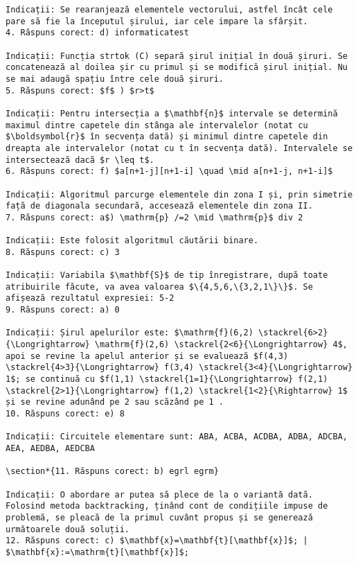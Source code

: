 \begin{verbatim}
Indicații: Se rearanjează elementele vectorului, astfel încât cele pare să fie la începutul șirului, iar cele impare la sfârșit.
4. Răspuns corect: d) informaticatest

Indicații: Funcția strtok (C) separă șirul inițial în două șiruri. Se concatenează al doilea șir cu primul și se modifică șirul inițial. Nu se mai adaugă spațiu între cele două șiruri.
5. Răspuns corect: $f$ ) $r>t$

Indicații: Pentru intersecția a $\mathbf{n}$ intervale se determină maximul dintre capetele din stânga ale intervalelor (notat cu $\boldsymbol{r}$ în secvența dată) și minimul dintre capetele din dreapta ale intervalelor (notat cu t în secvența dată). Intervalele se intersectează dacă $r \leq t$.
6. Răspuns corect: f) $a[n+1-j][n+1-i] \quad \mid a[n+1-j, n+1-i]$

Indicații: Algoritmul parcurge elementele din zona I și, prin simetrie față de diagonala secundară, accesează elementele din zona II.
7. Răspuns corect: a$) \mathrm{p} /=2 \mid \mathrm{p}$ div 2

Indicații: Este folosit algoritmul căutării binare.
8. Răspuns corect: c) 3

Indicații: Variabila $\mathbf{S}$ de tip înregistrare, după toate atribuirile făcute, va avea valoarea $\{4,5,6,\{3,2,1\}\}$. Se afișează rezultatul expresiei: 5-2
9. Răspuns corect: a) 0

Indicații: Șirul apelurilor este: $\mathrm{f}(6,2) \stackrel{6>2}{\Longrightarrow} \mathrm{f}(2,6) \stackrel{2<6}{\Longrightarrow} 4$, apoi se revine la apelul anterior și se evaluează $f(4,3) \stackrel{4>3}{\Longrightarrow} f(3,4) \stackrel{3<4}{\Longrightarrow} 1$; se continuă cu $f(1,1) \stackrel{1=1}{\Longrightarrow} f(2,1) \stackrel{2>1}{\Longrightarrow} f(1,2) \stackrel{1<2}{\Rightarrow} 1$ și se revine adunând pe 2 sau scăzând pe 1 .
10. Răspuns corect: e) 8

Indicații: Circuitele elementare sunt: ABA, ACBA, ACDBA, ADBA, ADCBA, AEA, AEDBA, AEDCBA

\section*{11. Răspuns corect: b) egrl egrm}

Indicații: O abordare ar putea să plece de la o variantă dată. Folosind metoda backtracking, ținând cont de condițiile impuse de problemă, se pleacă de la primul cuvânt propus și se generează următoarele două soluții.
12. Răspuns corect: c) $\mathbf{x}=\mathbf{t}[\mathbf{x}]$; | $\mathbf{x}:=\mathrm{t}[\mathbf{x}]$;


\end{verbatim}
